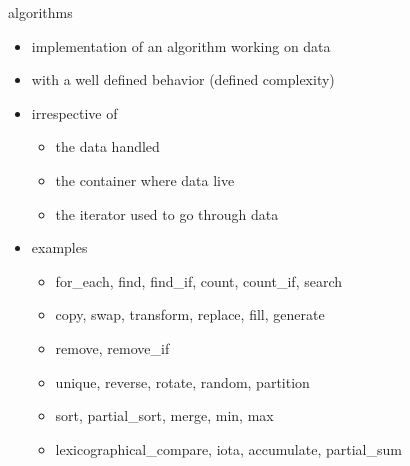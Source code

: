 \begin{frame}[fragile]
  \begin{block}{algorithms}
    \begin{itemize}
    \item implementation of an algorithm working on data
    \item with a well defined behavior (defined complexity)
    \item irrespective of
      \begin{itemize}
      \item the data handled
      \item the container where data live
      \item the iterator used to go through data
      \end{itemize}
    \item examples
      \begin{itemize}
      \item for\_each, find, find\_if, count, count\_if, search
      \item copy, swap, transform, replace, fill, generate
      \item remove, remove\_if
      \item unique, reverse, rotate, random, partition
      \item sort, partial\_sort, merge, min, max
      \item lexicographical\_compare, iota, accumulate, partial\_sum
      \end{itemize}
    \end{itemize}
  \end{block}
\end{frame}
      
